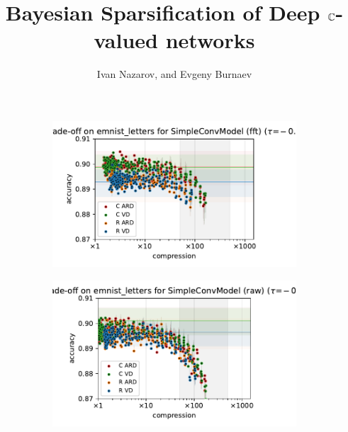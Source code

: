 \documentclass[a4paper,10pt,onecolumn]{article}
\title{Bayesian Sparsification of Deep $\mathbb{C}$-valued networks}
\author{Ivan Nazarov, and Evgeny Burnaev}
\begin{document}
\maketitle
\listoffigures

\clearpage

\begin{figure}[b]
  \centering
  \begin{subfigure}[b]{0.5\columnwidth}
    \centering
    \includegraphics[width=\columnwidth]{figure__mnist-like__method_comparison/appendix__SimpleConvModel__emnist_letters__fft__-0.5.pdf}
  \end{subfigure}%
  \begin{subfigure}[b]{0.5\columnwidth}
    \centering
    \includegraphics[width=\columnwidth]{figure__mnist-like__method_comparison/appendix__SimpleConvModel__emnist_letters__raw__-0.5.pdf}
  \end{subfigure} \\ %
  \begin{subfigure}[b]{0.5\columnwidth}
    \centering

\end{subfigure}
\end{figure}
\end{document}
